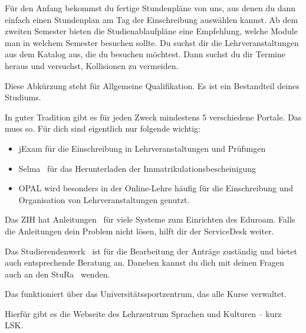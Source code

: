 Für den Anfang bekommst du fertige Stundenpläne von uns, aus denen du dann einfach einen Stundenplan am Tag der Einschreibung auswählen kannst. Ab dem zweiten Semester bieten die Studienablaufpläne eine Empfehlung, welche Module man in welchem Semester besuchen sollte. Du suchst dir die Lehrveranstaltungen aus dem Katalog aus, die du besuchen möchtest. Dann suchst du dir Termine heraus und versuchst, Kollisionen zu vermeiden.

Diese Abkürzung steht für Allgemeine Qualifikation. Es ist ein Bestandteil deines Studiums.~

In guter Tradition gibt es für jeden Zweck mindestens 5 verschiedene Portale. Das muss so. Für dich sind eigentlich nur folgende wichtig:
\begin{itemize}
\item jExam für die Einschreibung in Lehrveranstaltungen und Prüfungen
\item Selma~ für das Herunterladen der Immatrikulationsbescheinigung
\item OPAL wird besonders in der Online-Lehre häufig für die Einschreibung und Organisation von Lehrveranstaltungen genutzt.
\end{itemize}

Das ZIH hat Anleitungen~ für viele Systeme zum Einrichten des Eduroam. Falls die Anleitungen dein Problem nicht lösen, hilft dir der ServiceDesk weiter.

Das Studierendenwerk~ ist für die Bearbeitung der Anträge zuständig und bietet auch entsprechende Beratung an. Daneben kannst du dich mit deinen Fragen auch an den StuRa~ wenden.

Das funktioniert über das Universitätssportzentrum, das alle Kurse verwaltet.~ 

Hierfür gibt es die Webseite des Lehrzentrum Sprachen und Kulturen -- kurz LSK.~

